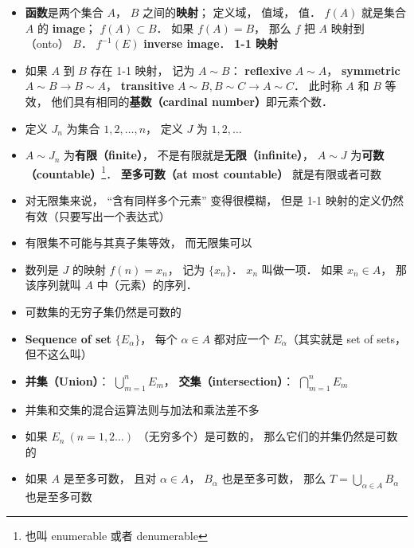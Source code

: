 \begin{itemize}
\item \textbf{函数}是两个集合 $A$， $B$ 之间的\textbf{映射}； 定义域， 值域， 值． $f(A)$ 就是集合 $A$ 的 \textbf{image}； $f(A) \subset B$． 如果 $f(A) = B$， 那么 $f$ 把 $A$ 映射到（onto） $B$． $f^{-1}(E)$ \textbf{inverse image}． \textbf{1-1 映射}

\item 如果 $A$ 到 $B$ 存在 1-1 映射， 记为 $A \sim B$： \textbf{reflexive} $A \sim A$， \textbf{symmetric} $A \sim B \to B \sim A$， \textbf{transitive} $A \sim B, B \sim C \to A \sim C$． 此时称 $A$ 和 $B$ 等效， 他们具有相同的\textbf{基数（cardinal number）}即元素个数．

\item 定义 $J_n$ 为集合 $1,2,\dots, n$， 定义 $J$ 为 $1, 2, \dots$

\item $A \sim J_n$ 为\textbf{有限（finite）}， 不是有限就是\textbf{无限（infinite）}， $A \sim J$ 为\textbf{可数（countable）}\footnote{也叫 enumerable 或者 denumerable}． \textbf{至多可数（at most countable）} 就是有限或者可数

\item 对无限集来说， “含有同样多个元素” 变得很模糊， 但是 1-1 映射的定义仍然有效（只要写出一个表达式）

\item 有限集不可能与其真子集等效， 而无限集可以

\item 数列是 $J$ 的映射 $f(n) = x_n$， 记为 $\{x_n\}$． $x_n$ 叫做一项． 如果 $x_n \in A$， 那该序列就叫 $A$ 中（元素）的序列．

\item 可数集的无穷子集仍然是可数的

\item \textbf{Sequence of set} $\{E_\alpha\}$， 每个 $\alpha \in A$ 都对应一个 $E_\alpha$（其实就是 set of sets， 但不这么叫）

\item \textbf{并集（Union）}： $\bigcup\limits_{m = 1}^n E_m$， \textbf{交集（intersection）}： $\bigcap\limits_{m = 1}^n E_m$

\item 并集和交集的混合运算法则与加法和乘法差不多

\item 如果 $E_n\ (n = 1, 2\dots)$ （无穷多个）是可数的， 那么它们的并集仍然是可数的

\item 如果 $A$ 是至多可数， 且对 $\alpha \in A$， $B_\alpha$ 也是至多可数， 那么 $T = \bigcup_{\alpha \in A} B_\alpha$ 也是至多可数


\end{itemize}

